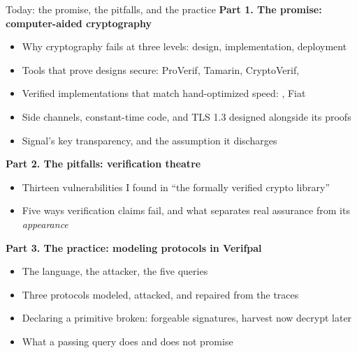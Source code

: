 \ifdefined\PRESENTATION\else\PassOptionsToClass{handout}{beamer}\fi\documentclass[aspectratio=169, lualatex]{beamer}
\begin{document}
\begin{frame}{Today: the promise, the pitfalls, and the practice}
	\footnotesize
	\textbf{Part 1. The promise: computer-aided cryptography}
	\begin{itemize}
		\item Why cryptography fails at three levels: design, implementation, deployment
		\item Tools that prove designs secure: ProVerif, Tamarin, CryptoVerif, \fstar
		\item Verified implementations that match hand-optimized speed: \haclstar, Fiat
		\item Side channels, constant-time code, and TLS 1.3 designed alongside its proofs
		\item Signal's key transparency, and the assumption it discharges
	\end{itemize}
	\textbf{Part 2. The pitfalls: verification theatre}
	\begin{itemize}
		\item Thirteen vulnerabilities I found in ``the formally verified crypto library''
		\item Five ways verification claims fail, and what separates real assurance from its \textit{appearance}
	\end{itemize}
	\textbf{Part 3. The practice: modeling protocols in Verifpal}
	\begin{itemize}
		\item The language, the attacker, the five queries
		\item Three protocols modeled, attacked, and repaired from the traces
		\item Declaring a primitive broken: forgeable signatures, harvest now decrypt later
		\item What a passing query does and does not promise
	\end{itemize}
\end{frame}

\end{document}
